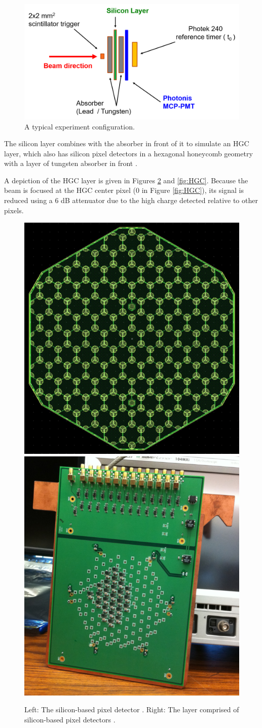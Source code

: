\documentclass[twocolumn,aps,prd,reprint,superscriptaddress,floatfix]{revtex4-1}
\begin{document}
\begin{figure}[!htb]
	\centering
	\includegraphics[width=\linewidth]{si_setup.png}
	\caption{A typical experiment configuration.}
	\label{fig:setup}
\end{figure}

The silicon layer combines with the absorber in front of it to simulate an HGC layer, which also has silicon pixel detectors in a hexagonal honeycomb geometry with a layer of tungsten absorber in front \cite{P2}.

A depiction of the HGC layer is given in Figures \ref{fig:silicon-layer} and \ref{fig:HGC}. 
Because the beam is focused at the HGC center pixel (0 in Figure \ref{fig:HGC}), its signal is reduced using a 6 dB attenuator due to the high charge detected relative to other pixels.

\begin{figure}[!htb]
	\centering
	\includegraphics[width=.464\linewidth]{silicon_pixel.png}
	\includegraphics[width=.45\linewidth]{silicon_layer.png}
	\label{fig:silicon-layer}
    \caption{Left: The silicon-based pixel detector \cite{Si_ppt}. 
    Right: The layer comprised of silicon-based pixel detectors \cite{Si_ppt}.}
\end{figure}
\end{document}
